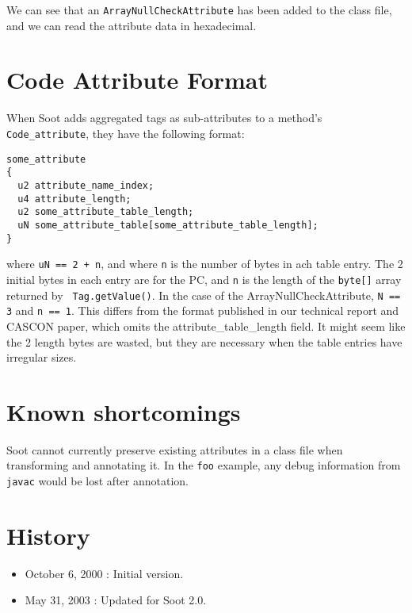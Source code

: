 \documentclass{article}
\begin{document}
We can see that an {\tt ArrayNullCheckAttribute} has been added to
the class file, and we can read the attribute data in hexadecimal.

\section{Code Attribute Format}
\label{sec:format}

When Soot adds aggregated tags as sub-attributes to a method's {\tt
  Code_attribute}, they have the following format:

\begin{verbatim}
some_attribute
{
  u2 attribute_name_index;
  u4 attribute_length;
  u2 some_attribute_table_length;
  uN some_attribute_table[some_attribute_table_length];
} 
\end{verbatim}

where {\tt uN == 2 + n}, and where {\tt n} is the number of bytes in
ach table entry.  The 2 initial bytes in each entry are for the PC,
and {\tt n} is the length of the {\tt byte[]} array returned by {\tt
  Tag.getValue()}.  In the case of the ArrayNullCheckAttribute, {\tt N
  == 3} and {\tt n == 1}.  This differs from the format published in
our technical report and CASCON paper, which omits the
attribute_table_length field.  It might seem like the 2 length bytes
are wasted, but they are necessary when the table entries have
irregular sizes.
 
\section*{Known shortcomings}
Soot cannot currently preserve existing attributes in a class file
when transforming and annotating it.  In the {\tt foo} example,
any debug information from {\tt javac} would be lost after annotation.

\section*{History}
\begin{itemize}
\item October 6, 2000 : Initial version.
\item May 31, 2003 : Updated for Soot 2.0.
\end{itemize}
\end{document}
